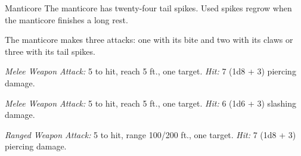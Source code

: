 \documentclass[10pt,a4paper,twoside,bg=print,twocolumn,openany,nodeprecatedcode]{dndbook}
\begin{document}
\begin{DndMonster}[float=t]{Manticore}
\DndMonsterBasics[
armor-class = {14 (natural armor)},
hit-points = {\DndDice{8d10 + 24}},
speed = {30 ft., fly 50 ft.}
]
\DndMonsterAbilityScores[
 str = 17,
 dex = 16,
 con = 17,
 int = 7,
 wis = 12,
 cha = 8
]
\DndMonsterDetails[
senses = {darkvision 60 ft., passive perception 11},
languages = {Common},
challenge = 3,
]
The manticore has twenty-four tail spikes. Used spikes regrow when the manticore finishes a long rest.

The manticore makes three attacks: one with its bite and two with its claws or three with its tail spikes.

\textsl{Melee Weapon Attack:} 5 to hit, reach 5 ft., one target. \textsl{Hit:} 7 (1d8 + 3) piercing damage.

\textsl{Melee Weapon Attack:} 5 to hit, reach 5 ft., one target. \textsl{Hit:} 6 (1d6 + 3) slashing damage.

\textsl{Ranged Weapon Attack:} 5 to hit, range 100/200 ft., one target. \textsl{Hit:} 7 (1d8 + 3) piercing damage.

\end{DndMonster}


\clearpage
\end{document}
